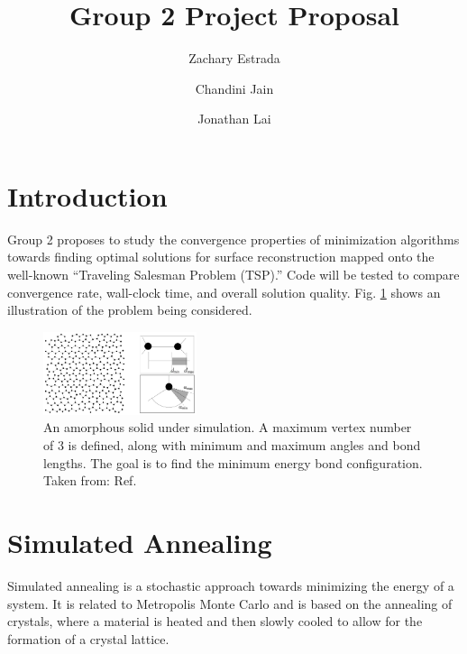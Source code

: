 \documentclass[10pt,twocolumn,notitlepage]{article}
\title{\vspace{-12ex} \textbf{Group 2 Project Proposal}}
\author{Zachary Estrada \and Chandini Jain \and Jonathan Lai}
\begin{document}
\maketitle
\thispagestyle{empty}


\section{Introduction}
Group 2 proposes to study the convergence properties of minimization algorithms towards finding optimal solutions for surface reconstruction mapped onto the well-known ``Traveling Salesman Problem (TSP).''  Code will be tested to compare convergence rate, wall-clock time, and overall solution quality. Fig. \ref{fig:amorphousSilicon} shows an illustration of the problem being considered.

\begin{figure}[h!]
	\centering
	\includegraphics[width=0.4\textwidth]{Figures/amorphousSilicon.png}
	\caption{An amorphous solid under simulation.  A maximum vertex number of 3 is defined, along with minimum and maximum angles and bond lengths.  The goal is to find the minimum energy bond configuration. Taken from: Ref. \protect{}}
	\label{fig:amorphousSilicon}
\end{figure}

\section{Simulated Annealing}
Simulated annealing is a stochastic approach towards minimizing the energy of a system.  It is related to Metropolis Monte Carlo and is based on the annealing of crystals, where a material is heated and then slowly cooled to allow for the formation of a crystal lattice.
\end{document}
